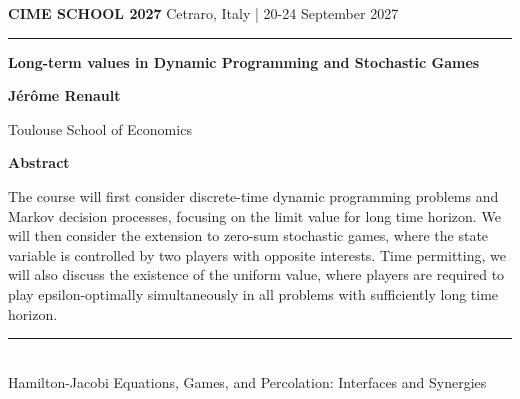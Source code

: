 \documentclass[11pt,a4paper]{article}
\begin{document}
{\small\bfseries\color{cimegold} CIME SCHOOL 2027}\hfill
{\small\color{cimeblue} Cetraro, Italy | 20-24 September 2027}

\vspace{5mm}
{\color{cimenavy}\rule{\textwidth}{1.2pt}}
\vspace{8mm}

{\fontsize{22}{27}\selectfont\bfseries\color{cimenavy}
Long-term values in Dynamic Programming and Stochastic Games\par}

\vspace{7mm}
{\large\bfseries J\'er\^ome Renault}\par
{\color{cimeblue} Toulouse School of Economics}

\vspace{10mm}
{\large\bfseries\color{cimegold} Abstract}

The course will first consider discrete-time dynamic programming problems and Markov decision processes, focusing on the limit value for long time horizon. We will then consider the extension to zero-sum stochastic games, where the state variable is controlled by two players with opposite interests. Time permitting, we will also discuss the existence of the uniform value, where players are required to play epsilon-optimally simultaneously in all problems with sufficiently long time horizon.

\vfill
{\color{cimenavy}\rule{\textwidth}{0.5pt}}\\[-1mm]
{\footnotesize\color{cimeblue} Hamilton-Jacobi Equations, Games, and Percolation: Interfaces and Synergies}
\end{document}
